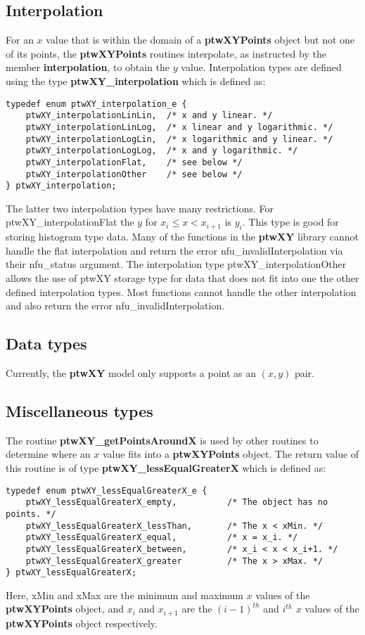\documentclass[11pt]{article}
\newcommand{\highlight}[1]{{\bf #1}}
\begin{document}
\subsection{Interpolation} \label{interpolationSection}
For an $x$ value that is within the domain of a \highlight{ptwXYPoints} object but not one of its points, the \highlight{ptwXYPoints} 
routines interpolate, as instructed by the member \highlight{interpolation}, to obtain the $y$ value. Interpolation types are
defined using the type \highlight{ptwXY\_interpolation} which is defined as:
\begin{verbatim}
typedef enum ptwXY_interpolation_e { 
    ptwXY_interpolationLinLin,  /* x and y linear. */
    ptwXY_interpolationLinLog,  /* x linear and y logarithmic. */
    ptwXY_interpolationLogLin,  /* x logarithmic and y linear. */
    ptwXY_interpolationLogLog,  /* x and y logarithmic. */
    ptwXY_interpolationFlat,    /* see below */
    ptwXY_interpolationOther    /* see below */
} ptwXY_interpolation;
\end{verbatim}
The latter two interpolation types have many restrictions. For ptwXY\_interpolationFlat the $y$ for $x_i \le x < x_{i+1}$ is $y_i$.
This type is good for storing histogram type data.
Many of the functions in the \highlight{ptwXY} library cannot handle the flat interpolation and return the error
nfu\_invalidInterpolation via their nfu\_status argument. The interpolation type ptwXY\_interpolationOther
allows the use of ptwXY storage type for data that does not fit into one the other defined interpolation types. Most
functions cannot handle the other interpolation and also return the error nfu\_invalidInterpolation.

\subsection{Data types}
Currently, the \highlight{ptwXY} model only supports a point as an $(x, y)$ pair. 

\subsection{Miscellaneous types}
The routine \highlight{ptwXY\_getPointsAroundX} is used by other routines to determine
where an $x$ value fits into a \highlight{ptwXYPoints} object. The return value of this
routine is of type \highlight{ptwXY\_less\-Equal\-GreaterX} which is defined as:
\begin{verbatim}
typedef enum ptwXY_lessEqualGreaterX_e {
    ptwXY_lessEqualGreaterX_empty,          /* The object has no points. */
    ptwXY_lessEqualGreaterX_lessThan,       /* The x < xMin. */
    ptwXY_lessEqualGreaterX_equal,          /* x = x_i. */
    ptwXY_lessEqualGreaterX_between,        /* x_i < x < x_i+1. */
    ptwXY_lessEqualGreaterX_greater         /* The x > xMax. */
} ptwXY_lessEqualGreaterX;
\end{verbatim}
Here, xMin and xMax are the minimum and maximum $x$ values of the \highlight{ptwXYPoints} object, and
$x_i$ and $x_{i+1}$ are the $(i-1)^{th}$ and $i^{th}$ $x$ values of the \highlight{ptwXYPoints} object respectively.
\end{document}
